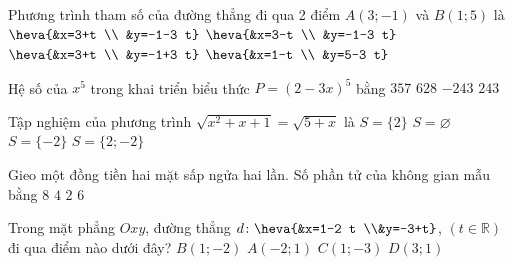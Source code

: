 \begin{ex}%
Phương trình tham số của đường thẳng đi qua 2 điểm $A(3 ;-1)$ và $B(1 ; 5)$ là
\choice
{\True $\heva{&x=3+t \\ &y=-1-3 t}$}
{$\heva{&x=3-t \\ &y=-1-3 t}$}
{$\heva{&x=3+t \\ &y=-1+3 t}$}
{$\heva{&x=1-t \\ &y=5-3 t}$}
\end{ex}
\begin{ex}%
Hệ số của $x^5$ trong khai triển biểu thức $P=(2-3 x)^5$ bằng
\choice
{$357$}
{$628$}
{\True $-243$}
{$243$}
\end{ex}
\begin{ex}%
Tập nghiệm của phương trình $\sqrt{x^2+x+1}=\sqrt{5+x}$ là
\choice
{$S=\{2\}$}
{$S=\varnothing$}
{$S=\{-2\}$}
{\True $S=\{2 ;-2\}$}
\end{ex}
\begin{ex}%
Gieo một đồng tiền hai mặt sấp ngửa hai lần. Số phần tử của không gian mẫu bằng
\choice
{$8$}
{\True $4$}
{$2$}
{$6$}
\end{ex}
\begin{ex}%
Trong mặt phẳng $O x y$, đường thẳng $d\colon\heva{&x=1-2 t \\&y=-3+t}$, $(t \in \mathbb{R})$ đi qua điểm nào dưới đây?
\choice
{$B(1 ;-2)$}
{$A(-2 ; 1)$}
{\True $C(1 ;-3)$}
{$D(3 ; 1)$}
\end{ex}
